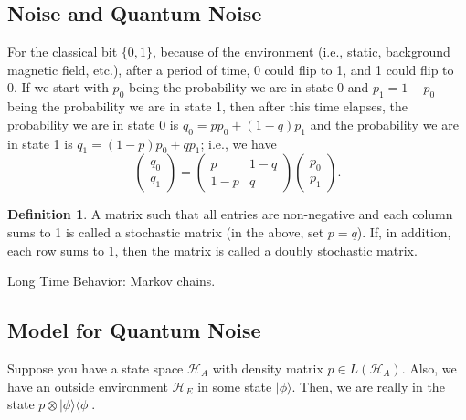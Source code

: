 \documentclass[12pt]{article}
\theoremstyle{definition}
\newtheorem*{definition}{Definition}
\newcommand{\ket}[1]{|#1\rangle}
\newcommand{\ketbra}[2]{|#1\rangle\langle #2|}
\begin{document}
\subsection{Noise and Quantum Noise}

For the classical bit $\{0,1\}$, because of the environment (i.e., static, background magnetic field, etc.), after a period of time, 0 could flip to 1, and 1 could flip to 0. If we start with $p_0$ being the probability we are in state 0 and $p_1=1-p_0$ being the probability we are in state 1, then after this time elapses, the probability we are in state 0 is $q_0=pp_0+(1-q)p_1$ and the probability we are in state 1 is $q_1=(1-p)p_0+qp_1$; i.e., we have
\[
\begin{pmatrix}q_0\\ q_1\end{pmatrix} = \begin{pmatrix}p & 1-q\\ 1-p & q\end{pmatrix}\begin{pmatrix}p_0\\ p_1\end{pmatrix}.
\]

\begin{definition}
A matrix such that all entries are non-negative and each column sums to 1 is called a stochastic matrix (in the above, set $p=q$). If, in addition, each row sums to 1, then the matrix is called a doubly stochastic matrix.
\end{definition}
Long Time Behavior: Markov chains.

\subsection{Model for Quantum Noise}

Suppose you have a state space $\mathcal{H}_A$ with density matrix $p \in L(\mathcal{H}_A)$. Also, we have an outside environment $\mathcal{H}_E$ in some state $\ket{\phi}$. Then, we are really in the state $p \otimes \ketbra{\phi}{\phi}$.
\end{document}
